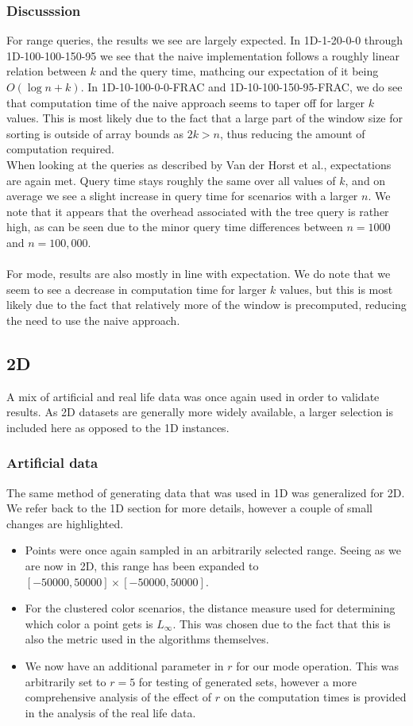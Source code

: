 \documentclass{article}
\begin{document}
\subsubsection*{Discusssion}
For range queries, the results we see are largely expected. In 1D-1-20-0-0 through 1D-100-100-150-95 we see that the naive implementation follows a roughly linear relation between $k$ and the query time, mathcing our expectation of it being $O(\log n + k)$. In 1D-10-100-0-0-FRAC and 1D-10-100-150-95-FRAC, we do see that computation time of the naive approach seems to taper off for larger $k$ values. This is most likely due to the fact that a large part of the window size for sorting is outside of array bounds as $2k > n$, thus reducing the amount of computation required. \\ 
When looking at the queries as described by Van der Horst et al., expectations are again met. Query time stays roughly the same over all values of $k$, and on average we see a slight increase in query time for scenarios with a larger $n$. We note that it appears that the overhead associated with the tree query is rather high, as can be seen due to the minor query time differences between $n=1000$ and $n=100,000$. \\\\
For mode, results are also mostly in line with expectation. We do note that we seem to see a decrease in computation time for larger $k$ values, but this is most likely due to the fact that relatively more of the window is precomputed, reducing the need to use the naive approach. 

\subsection{2D}
A mix of artificial and real life data was once again used in order to validate results. As 2D datasets are generally more widely available, a larger selection is included here as opposed to the 1D instances. 
\subsubsection*{Artificial data}
The same method of generating data that was used in 1D was generalized for 2D. We refer back to the 1D section for more details, however a couple of small changes are highlighted.
\begin{itemize}
    \item Points were once again sampled in an arbitrarily selected range. Seeing as we are now in 2D, this range has been expanded to $[-50000, 50000] \times [-50000, 50000]$.
    \item For the clustered color scenarios, the distance measure used for determining which color a point gets is $L_\infty$. This was chosen due to the fact that this is also the metric used in the algorithms themselves.
    \item We now have an additional parameter in $r$ for our mode operation. This was arbitrarily set to $r=5$ for testing of generated sets, however a more comprehensive analysis of the effect of $r$ on the computation times is provided in the analysis of the real life data.
\end{itemize}
\end{document}
